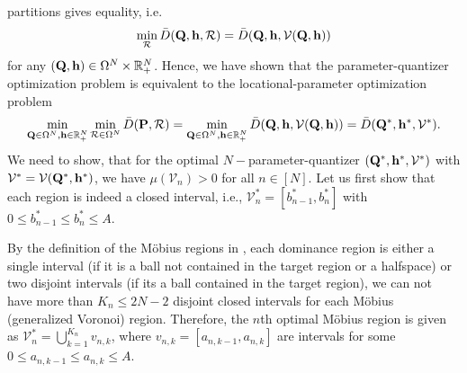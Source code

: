 \documentclass[12pt,onecolumn,final,letterpaper]{IEEEtran}
\renewcommand{\vQ}{\mathbf P}
\renewcommand{\vP}{\mathbf Q}
\newcommand{\Vor}{\ensuremath{\mathcal{V}}}         %
\newcommand{\Rset}{\ensuremath{\mathcal R}}
\newcommand{\Dis}{\ensuremath{D}}                    %
\newcommand{\AvDis}{\ensuremath{\bar{\Dis}}}         %
\begin{document}
  partitions gives equality, i.e.
  \begin{align}
    \min_{\Rset} \AvDis(\vP,\vh,\Rset)=\AvDis(\vP,\vh,\Vor(\vP,\vh))
  \end{align}
  for any $(\vP,\vh)\in\Ome^N\times\R_+^N$.
  Hence, we have shown that the parameter-quantizer optimization problem is equivalent to the locational-parameter
  optimization problem
  \begin{align}
    \min_{\vP\in\Ome^N,\vh\in\R_+^N} \min_{\Rset\in\Ome^N} \AvDis(\vQ,\Rset) 
    = \min_{\vP\in\Ome^N,\vh\in\R_+^N} \AvDis(\vP,\vh,\Vor(\vP,\vh))=\AvDis(\vP^*,\vh^*,\Vor^*).\label{eq:optquanteqoptdeploy2}
  \end{align}
  We need to show, that for the optimal $N-$parameter-quantizer $(\vP^*,\vh^*,\Vor^*)$ with $\Vor^*=\Vor(\vP^*,\vh^*)$,
  we have $\mu(\Vor_n)>0$ for all $n\in[N]$.  Let us first show that each region is indeed a closed interval, i.e.,
  $\Vor_n^*=[b^*_{n-1},b^*_n]$ with $0\leq b^*_{n-1}\leq b^*_n\leq A$. 
  
  By the definition of the Möbius regions in , each dominance region is either a single interval
  (if it is a ball not contained in the target region or a halfspace) or two disjoint intervals (if its a ball contained
  in the target region), we can not have more than $K_n\leq 2N-2$ disjoint closed intervals for each Möbius (generalized
  Voronoi) region.  Therefore, the $n$th optimal Möbius region is given as $\Vor^*_n=\bigcup_{k=1}^{K_n}v_{n,k}$, where
  $v_{n,k}=[a_{n,k-1},a_{n,k}]$ are intervals for some $0\leq a_{n,k-1}\leq a_{n,k}\leq A$.
\end{document}
